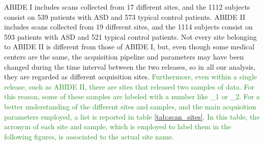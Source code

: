 \documentclass[11pt]{report}
\begin{document}
ABIDE I includes scans collected from 17 different sites, and the 1112 subjects consist on 539 patients with ASD and 573 typical control patients.
ABIDE II includes scans collected from 19 different sites, and the 1114 subjects consist on 593 patients with ASD and 521 typical control patients.
Not every site belonging to ABIDE II is different from those of ABIDE I, but, even though some medical centers are the same, the acquisition pipeline and parameters may have been changed during the time interval between the two releases, so in all our analysis, they are regarded as different acquisition sites.
\textcolor{ForestGreen}{
Furthermore, even within a single release, such as ABIDE II, there are sites that released two samples of data.
For this reason, some of these samples are labeled with a number like \_1 or \_2. 
For a better understanding of the different sites and samples, and the main acquisition parameters employed, a list is reported in table \ref{tab:scan_sites}.
In this table, the acronym of each site and sample, which is employed to label them in the following figures, is associated to the actual site name.
}
\end{document}
